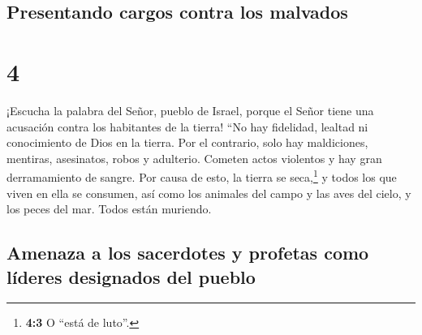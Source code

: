 \hypertarget{presentando-cargos-contra-los-malvados}{%
\subsection{Presentando cargos contra los
malvados}\label{presentando-cargos-contra-los-malvados}}

\hypertarget{section-3}{%
\section{4}\label{section-3}}

 ¡Escucha la palabra del Señor, pueblo de Israel, porque
el Señor tiene una acusación contra los habitantes de la tierra! ``No
hay fidelidad, lealtad ni conocimiento de Dios en la tierra.
 Por el contrario, solo hay maldiciones, mentiras,
asesinatos, robos y adulterio. Cometen actos violentos y hay gran
derramamiento de sangre.  Por causa de esto, la tierra se
seca,\footnote{\textbf{4:3} O ``está de luto''.} y todos los que viven
en ella se consumen, así como los animales del campo y las aves del
cielo, y los peces del mar. Todos están muriendo.

\hypertarget{amenaza-a-los-sacerdotes-y-profetas-como-luxedderes-designados-del-pueblo}{%
\subsection{Amenaza a los sacerdotes y profetas como líderes designados
del
pueblo}\label{amenaza-a-los-sacerdotes-y-profetas-como-luxedderes-designados-del-pueblo}}

